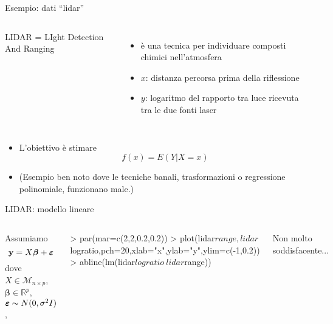 \documentclass{beamer}
\begin{document}
\begin{frame}[fragile]{Esempio: dati ``lidar''}
\begin{columns}
LIDAR = LIght Detection And Ranging
\begin{itemize}
\item \`e una tecnica per individuare composti chimici nell'atmosfera
\item $x$: distanza percorsa prima della riflessione
\item $y$: logaritmo del rapporto tra luce ricevuta tra le due fonti laser
\end{itemize}
\end{columns}

\begin{itemize}
\item L'obiettivo \`e stimare
\[ f(x) = E(Y|X=x) \]
\item
(Esempio ben noto dove le tecniche banali, trasformazioni o regressione polinomiale, funzionano male.)
\end{itemize}
\end{frame}



\begin{frame}[t]{LIDAR: modello lineare}
\begin{columns}[T]
Assumiamo
\[ {\bf y} = X{\bm\beta} + {\bm\varepsilon} \]
dove $X\in\mathcal M_{n\times p}$, ${\bm\beta}\in\mathbb R^p$, ${\bm\varepsilon}\thicksim N(0,\sigma^2I)$, 
\begin{Schunk}
\begin{Sinput}
> par(mar=c(2,2,0.2,0.2))
> plot(lidar$range,lidar$logratio,pch=20,xlab="x",ylab="y",ylim=c(-1,0.2))
> abline(lm(lidar$logratio~lidar$range))
\end{Sinput}
\end{Schunk}

Non molto soddisfacente...
\end{columns}
\end{frame}
\end{document}
